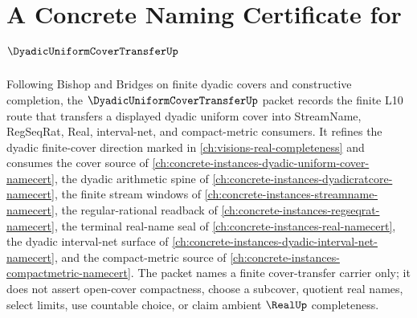 \chapter{A Concrete Naming Certificate for $\DyadicUniformCoverTransferUp$}
\label{ch:concrete-instances-dyadic-uniform-cover-transfer-namecert}

Following Bishop and Bridges on finite dyadic covers and constructive completion, the $\DyadicUniformCoverTransferUp$ packet records the finite L10 route that transfers a displayed dyadic uniform cover into StreamName, RegSeqRat, Real, interval-net, and compact-metric consumers. It refines the dyadic finite-cover direction marked in \autoref{ch:visions-real-completeness} and consumes the cover source of \autoref{ch:concrete-instances-dyadic-uniform-cover-namecert}, the dyadic arithmetic spine of \autoref{ch:concrete-instances-dyadicratcore-namecert}, the finite stream windows of \autoref{ch:concrete-instances-streamname-namecert}, the regular-rational readback of \autoref{ch:concrete-instances-regseqrat-namecert}, the terminal real-name seal of \autoref{ch:concrete-instances-real-namecert}, the dyadic interval-net surface of \autoref{ch:concrete-instances-dyadic-interval-net-namecert}, and the compact-metric source of \autoref{ch:concrete-instances-compactmetric-namecert}. The packet names a finite cover-transfer carrier only; it does not assert open-cover compactness, choose a subcover, quotient real names, select limits, use countable choice, or claim ambient $\RealUp$ completeness.

